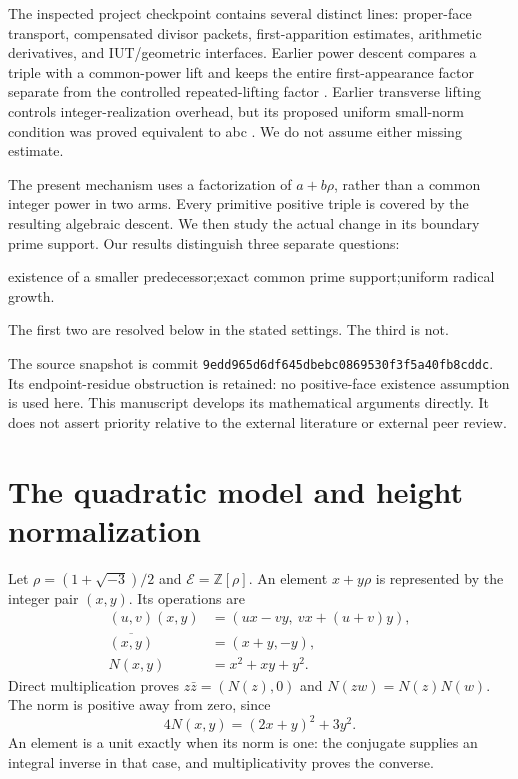 \documentclass[11pt]{article}
\theoremstyle{definition}
\theoremstyle{remark}
\newcommand{\ZZ}{\mathbb Z}
\begin{document}
The inspected project checkpoint \cite{project} contains several distinct lines: proper-face transport, compensated divisor packets, first-apparition estimates, arithmetic derivatives, and IUT/geometric interfaces. Earlier power descent compares a triple with a common-power lift and keeps the entire first-appearance factor separate from the controlled repeated-lifting factor \cite{power}. Earlier transverse lifting controls integer-realization overhead, but its proposed uniform small-norm condition was proved equivalent to abc \cite{transverse}. We do not assume either missing estimate.

The present mechanism uses a factorization of $a+b\rho$, rather than a common integer power in two arms. Every primitive positive triple is covered by the resulting algebraic descent. We then study the actual change in its boundary prime support. Our results distinguish three separate questions:
\begin{center}
existence of a smaller predecessor;\quad exact common prime support;\quad uniform radical growth.
\end{center}
The first two are resolved below in the stated settings. The third is not.

The source snapshot is commit \texttt{9edd965d6df645dbebc0869530f3f5a40fb8cddc}. Its endpoint-residue obstruction \cite{endpoint} is retained: no positive-face existence assumption is used here. This manuscript develops its mathematical arguments directly. It does not assert priority relative to the external literature or external peer review.

\section{The quadratic model and height normalization}
Let $\rho=(1+\sqrt{-3})/2$ and $\mathcal E=\ZZ[\rho]$. An element $x+y\rho$ is represented by the integer pair $(x,y)$. Its operations are
\begin{align}
(u,v)(x,y)&=(ux-vy,\ vx+(u+v)y),\label{eq:mul}\\
\overline{(x,y)}&=(x+y,-y),\\
N(x,y)&=x^2+xy+y^2.
\end{align}
Direct multiplication proves $z\bar z=(N(z),0)$ and $N(zw)=N(z)N(w)$. The norm is positive away from zero, since
\[
4N(x,y)=(2x+y)^2+3y^2.
\]
An element is a unit exactly when its norm is one: the conjugate supplies an integral inverse in that case, and multiplicativity proves the converse.
\end{document}
